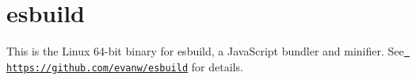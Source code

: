 \chapter{esbuild}
\hypertarget{md__2home_2solype_2delivery_2current__days_2trello_2front_2node__modules_2_0desbuild_2linux-x64_2README}{}\label{md__2home_2solype_2delivery_2current__days_2trello_2front_2node__modules_2_0desbuild_2linux-x64_2README}
\label{md__2home_2solype_2delivery_2current__days_2trello_2front_2node__modules_2_0desbuild_2linux-x64_2README_autotoc_md7789}%
%
 This is the Linux 64-\/bit binary for esbuild, a Java\+Script bundler and minifier. See \href{https://github.com/evanw/esbuild}{\texttt{ https\+://github.\+com/evanw/esbuild}} for details. 